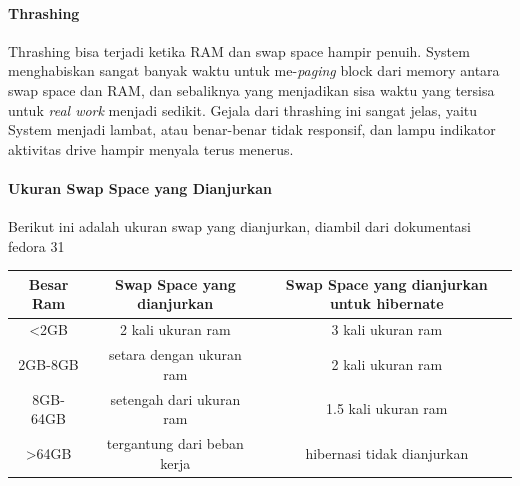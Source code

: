 \documentclass[a4paper,12pt]{article}
\begin{document}
\paragraph{Thrashing\\}
Thrashing bisa terjadi ketika RAM dan swap space hampir penuih. System menghabiskan sangat banyak waktu untuk me-\textit{paging} block dari memory antara swap space dan RAM, dan sebaliknya yang menjadikan sisa waktu yang tersisa untuk \textit{real work} menjadi sedikit. Gejala dari thrashing ini sangat jelas, yaitu System menjadi lambat, atau benar-benar tidak responsif, dan lampu indikator aktivitas drive hampir menyala terus menerus.

\paragraph{Ukuran Swap Space yang Dianjurkan\\}
Berikut ini adalah ukuran swap yang dianjurkan, diambil dari dokumentasi fedora 31
\begin{table}[!ht]
\begin{tabular}{|c|c|c|}
\hline
Besar Ram          & Swap Space yang dianjurkan  & Swap Space yang dianjurkan untuk hibernate \\ \hline
\textless{}2GB     & 2 kali ukuran ram           & 3 kali ukuran ram                          \\ \hline
2GB-8GB            & setara dengan ukuran ram    & 2 kali ukuran ram                          \\ \hline
8GB-64GB           & setengah  dari ukuran ram   & 1.5 kali ukuran ram                        \\ \hline
\textgreater{}64GB & tergantung dari beban kerja & hibernasi tidak dianjurkan                 \\ \hline
\end{tabular}
\end{table}

\newpage
\end{document}
